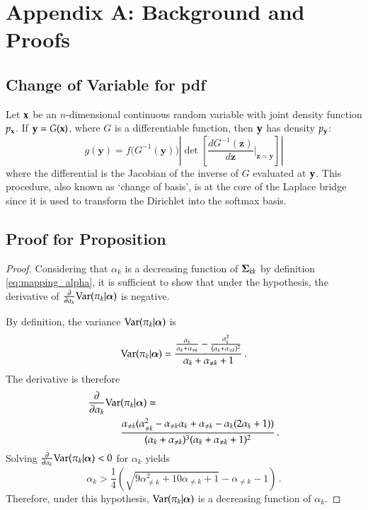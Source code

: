 \section*{Appendix A: Background and Proofs}
\label{sec:appendix_A}

\subsection*{Change of Variable for pdf} 
Let ${\mathbf{x}}$ be an $n$-dimensional continuous random variable with joint density function $p_{\mathbf{x}}$. If ${\mathbf{y}} = G({\mathbf{x}})$, where $G$ is a differentiable function, then ${\mathbf{y}}$ has density $p_{\mathbf{y}}$:
\begin{equation}
g(\mathbf{y}) = f\Big(G^{-1}(\mathbf{y})\Big)\left\vert \det\left[\frac{dG^{-1}(\mathbf{z})}{d\mathbf{z}}\Bigg \vert_{\mathbf{z}=\mathbf{y}}\right]\right \vert
\end{equation}
where the differential is the Jacobian of the inverse of $G$ evaluated at ${\mathbf{y}}$. This procedure, also known as `change of basis', is at the core of the Laplace bridge since it is used to transform the Dirichlet into the softmax basis.

\subsection*{Proof for Proposition}
\begin{proof}
    Considering that $\alpha_k$ is a decreasing function of ${\boldsymbol{\Sigma}}_{kk}$ by definition \eqref{eq:mapping_alpha}, it is sufficient to show that under the hypothesis, the derivative of $\frac{\partial}{\partial \alpha_k}\mathrm{Var}(\pi_k| {\boldsymbol{\alpha}})$ is negative.

    By definition, the variance $\mathrm{Var}(\pi_k | {\boldsymbol{\alpha}})$ is
    \begin{equation*}
        \mathrm{Var}(\pi_k | {\boldsymbol{\alpha}}) = \frac{\frac{\alpha_k}{\alpha_k + \alpha_{\neq k}} - \frac{\alpha_k^2}{(\alpha_k + \alpha_{\neq k})^2}}{\alpha_k + \alpha_{\neq k} + 1} \, .
    \end{equation*}
    The derivative is therefore
    \begin{align*}
        \frac{\partial}{\partial \alpha_k}\mathrm{Var}&(\pi_k | {\boldsymbol{\alpha}}) = \\
            &\frac{\alpha_{\neq k} (\alpha_{\neq k}^2 - \alpha_{\neq k} \alpha_k + \alpha_{\neq k} - \alpha_k (2 \alpha_k + 1))}{(\alpha_k + \alpha_{\neq k})^3 (\alpha_k + \alpha_{\neq k} + 1)^2} \, .
    \end{align*}
    Solving $\frac{\partial}{\partial \alpha_k}\mathrm{Var}(\pi_k| {\boldsymbol{\alpha}}) < 0$ for $\alpha_k$ yields
    \begin{equation*}
        \alpha_k > \frac{1}{4} \left(\sqrt{9\alpha_{\neq k}^2 + 10\alpha_{\neq k} + 1} - \alpha_{\neq k} - 1\right) \, .
    \end{equation*}
    Therefore, under this hypothesis, $\mathrm{Var}(\pi_k| {\boldsymbol{\alpha}})$ is a decreasing function of $\alpha_k$.
\end{proof}

